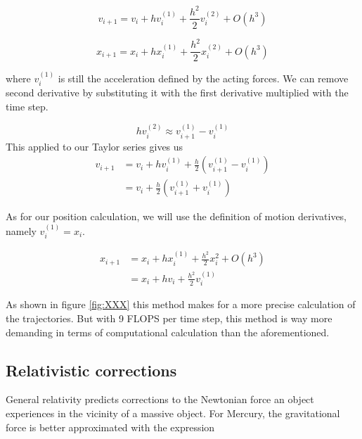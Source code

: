 \documentclass[10pt]{article}
\begin{document}
\begin{multicols}{2}
\begin{equation}
    v_{i+1} = v_i +hv_i^{(1)}+\frac{h^2}{2}v_i^{(2)}+O(h^3)
\end{equation}

\begin{equation}
    x_{i+1} = x_i +hx_i^{(1)}+\frac{h^2}{2}x_i^{(2)}+O(h^3)
\end{equation}

where $v_i^{(1)}$ is still the acceleration defined by the acting forces.
We can remove second derivative by substituting it with the first
derivative multiplied with the time step. 

\begin{equation}
    hv_i^{(2)} \approx v_{i+1}^{(1)}-v_i^{(1)}\nonumber
\end{equation}
This applied to our Taylor series gives us
\begin{align}
    v_{i+1} &= v_i + hv_i^{(1)}+\frac{h}{2}\left(v_{i+1}^{(1)}-v_i^{(1)}\right)\nonumber\\
    &= v_i+\frac{h}{2}\left(v_{i+1}^{(1)}+v_i^{(1)}\right)
\end{align}

As for our position calculation, we will use the definition of motion
derivatives, namely $v_i^{(1)}=x_i$.

\begin{align}
    x_{i+1} &= x_i +hx_i^{(1)}+\frac{h^2}{2}x_i^{2}+O(h^3)\nonumber\\
    &= x_i + hv_i + \frac{h^2}{2}v_i^{(1)}
\end{align}

As shown in figure \cref{fig:XXX} this method makes for a more precise
calculation of the trajectories. But with 9 FLOPS per time step, this
method is way more demanding in terms of computational calculation than the
aforementioned.


\subsection{Relativistic corrections}
General relativity predicts corrections to the Newtonian force an object
experiences in the vicinity of a massive object. For Mercury, the
gravitational force is better approximated with the expression


\end{multicols}
\end{document}
